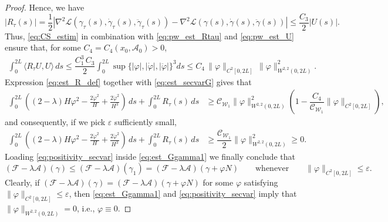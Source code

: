 \documentclass[11pt]{amsart}
\renewcommand{\leq}{\leqslant}
\renewcommand{\geq}{\geqslant}
\newcommand{\A}{\mathcal A}
\newcommand{\cA}{\A}
\newcommand{\Lag}{\mathscr{L}}
\newcommand{\cW}{\mathcal{W}_1}
\renewcommand{\phi}{\varphi}
\theoremstyle{definition}
\theoremstyle{remark}
\numberwithin{equation}{section}
\begin{document}
\begin{proof}
Hence, we have
\begin{equation} \label{eq:pw_est_Rtau}
|R_{\tau}(s)| = \dfrac{1}{2} |\nabla^2 \Lag(\gamma_{\tau}(s), \dot \gamma_{\tau}(s), \ddot \gamma_{\tau}(s)) - \nabla^2 \Lag(\gamma(s), \dot \gamma(s), \ddot \gamma(s))| \leq \dfrac{C_3}{2} |U(s)| . %
\end{equation}
Thus, \eqref{eq:CS_estim} in combination with \eqref{eq:pw_est_Rtau} and \eqref{eq:pw_est_U} ensure that, for some $C_4 = C_4(x_0,\cA_0) > 0$,
\begin{equation} \label{eq:est_R_def}
\begin{split}
\int_0^{2L} \langle R_{\tau} U, U \rangle \, ds \leq \dfrac{C_1^3 \, C_3}{2} \int_0^{2L} \sup \{ |\phi|, |\dot \phi|, |\ddot \phi| \}^3 ds %
\leq C_4 \, \| \phi \|_{C^2[0,2L]} \, \| \phi \|_{W^{2,2}(0,2L)}^2 . %
\end{split}
\end{equation}
Expression \eqref{eq:est_R_def} together with \eqref{eq:est_secvarG} gives that
\begin{equation*} %
\begin{split}
\int_0^{2L}\left((2-\lambda)H\varphi^2-\frac{2\dot\varphi^2}{H}+\frac{2\ddot\varphi^2}{H^3}\right)\,ds + \int_0^{2L} R_{\tau}(s) \, ds & \geq \mathcal{C}_{\cW} \| \phi \|_{W^{2,2}(0,2L)}^2 \left( 1 - \dfrac{C_4}{\mathcal{C}_{\cW}} \| \phi \|_{C^2[0,2L]} \right) ,
\end{split}
\end{equation*}
and consequently, if we pick $\varepsilon$ sufficiently small,
\begin{equation} \label{eq:positivity_secvar}
\begin{split}
\int_0^{2L}\left((2-\lambda)H\varphi^2-\frac{2\dot\varphi^2}{H}+\frac{2\ddot\varphi^2}{H^3}\right)\,ds + \int_0^{2L} R_{\tau}(s) \, ds & \geq \dfrac{\mathcal{C}_{\cW}}{2} \| \phi \|_{W^{2,2}(0,2L)}^2 \geq 0.
\end{split}
\end{equation}
Loading \eqref{eq:positivity_secvar} inside \eqref{eq:est_Ggamma1} we finally conclude that
\begin{equation*}
(\mathcal F-\lambda  \A )(\gamma) \leq (\mathcal F-\lambda  \A )(\gamma_1) = (\mathcal F-\lambda  \A )(\gamma + \phi N) \qquad \text{whenever} \qquad \| \phi \|_{C^2[0,2L]} \leq \varepsilon .
\end{equation*}
Clearly, if $(\mathcal F-\lambda  \A )(\gamma) = (\mathcal F-\lambda  \A )(\gamma + \phi N)$ for some $\phi$ satisfying $\| \phi \|_{C^2[0,2L]} \leq \varepsilon$, then \eqref{eq:est_Ggamma1} and \eqref{eq:positivity_secvar} imply that $\| \phi \|_{W^{2,2}(0,2L)} = 0$, i.e., $\phi \equiv 0$.
\end{proof}





\end{document}
